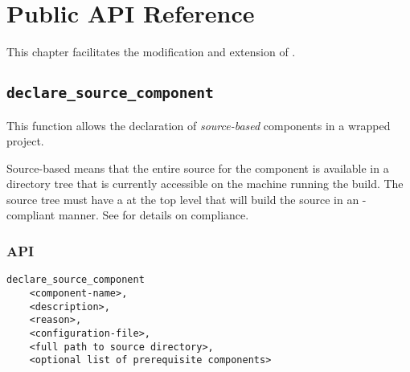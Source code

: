 %
%
%
%
\chapter{Public API Reference}\label{chap:api}

This chapter facilitates the modification and extension of \lmsbw.

\section{\texttt{declare\_source\_component}}\label{api:declare-source-component}

This function allows the declaration of \emph{source-based} components
in a wrapped project.

Source-based means that the entire source for the component is
available in a directory tree that is currently accessible on the
machine running the build.  The source tree must have a \makefile at
the top level that will build the source in an \lmsbw-compliant
manner.  See  for details on \makefile
compliance.

\subsection{API}

\begin{verbatim}
declare_source_component
    <component-name>,
    <description>,
    <reason>,
    <configuration-file>,
    <full path to source directory>,
    <optional list of prerequisite components>
\end{verbatim}

